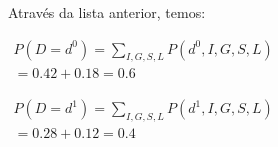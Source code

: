 Através da lista anterior, temos:

$\begin{array}{l}
\displaystyle P(D = {d^0}) = \sum\nolimits_{I,G,S,L}^{} {P({d^0},I,G,S,L)} \\
\displaystyle = 0.42 + 0.18 = 0.6
\end{array}$

$\begin{array}{l}
\displaystyle P(D = {d^1}) = \sum\nolimits_{I,G,S,L}^{} {P({d^1},I,G,S,L)} \\
\displaystyle = 0.28 + 0.12 = 0.4
\end{array}$

